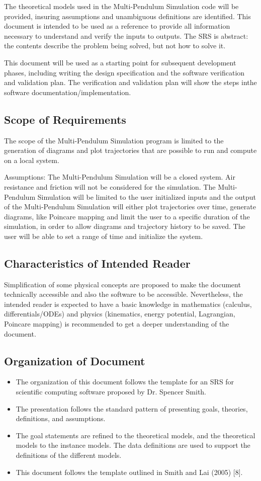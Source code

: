 \documentclass[12pt]{article}
\newcommand{\progname}{Multi-Pendulum Simulation }
\begin{document}
The theoretical models used in the \progname code will be provided, insuring
assumptions and unambiguous definitions are identified. This document 
is intended to be used as a reference to provide all information necessary to 
understand and verify the inputs to outputs. The SRS is abstract: the contents 
describe the problem being solved, but not how to solve it.

This document will be used as a starting point for subsequent development
phases, including writing the design specification and the software
verification and validation plan. The verification and validation plan will show
the steps inthe software documentation/implementation.

\subsection{Scope of Requirements} 

The scope of the \progname program is limited to the generation 
of diagrams and plot trajectories that are possible to run and compute on a
local system.

Assumptions: The \progname will be a closed system. Air resistance and friction
will
not be considered for the simulation. The \progname will be limited to the user
initialized inputs and
the output of the \progname will either plot trajectories over time, generate
diagrams, like Poincare mapping
and limit the user to a specific duration of the simulation, in order to allow
diagrams and trajectory history to be saved.
The user will be able to set a range of time and initialize the system. \\

\subsection{Characteristics of Intended Reader} 
Simplification of some physical concepts are proposed to make the document
technically accessible and also the software to be accessible.
Nevertheless, the intended reader is expected to have a basic knowledge in
mathematics (calculus, differentials/ODEs) and physics (kinematics, energy
potential, Lagrangian, Poincare mapping) is recommended to get a deeper
understanding of the document.

\subsection{Organization of Document}
\begin{itemize}
\item The organization of this document follows the template for an SRS for
scientific
computing software proposed by Dr. Spencer Smith. 
\item The presentation follows the standard pattern of presenting goals,
theories, definitions, and assumptions.
\item The goal statements are refined to the theoretical models, and the
theoretical
models to the instance models. The data definitions are used to support the
definitions of the different models.
\item This document follows the template outlined in Smith and Lai (2005) [8].
\end{itemize}
\newpage
\end{document}
